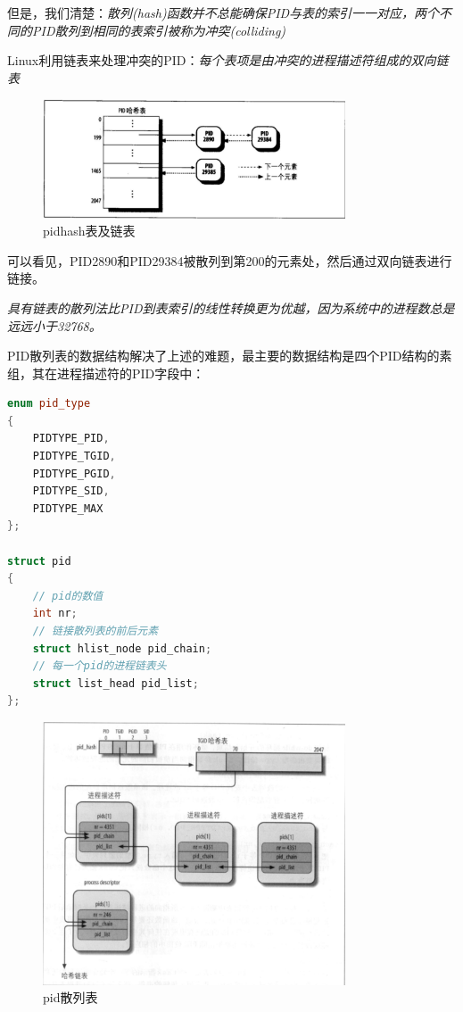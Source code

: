     但是，我们清楚：\emph{散列(hash)函数并不总能确保PID与表的索引一一对应，两个不同的PID散列到相同的表索引被称为冲突(colliding)}

    Linux利用链表来处理冲突的PID：\emph{每个表项是由冲突的进程描述符组成的双向链表}

\begin{figure}[!htbp]
    \centering
    \includegraphics[width=0.8\textwidth]{image/chapter03/pidhash表及链表.png}
    \caption{pidhash表及链表}
\end{figure}

    可以看见，PID2890和PID29384被散列到第200的元素处，然后通过双向链表进行链接。

    \emph{具有链表的散列法比PID到表索引的线性转换更为优越，因为系统中的进程数总是远远小于32768。}

    PID散列表的数据结构解决了上述的难题，最主要的数据结构是四个PID结构的素组，其在进程描述符的PID字段中：

\begin{lstlisting}[language=C++]
enum pid_type
{
	PIDTYPE_PID,
	PIDTYPE_TGID,
	PIDTYPE_PGID,
	PIDTYPE_SID,
	PIDTYPE_MAX
};

struct pid
{
    // pid的数值
	int nr;
    // 链接散列表的前后元素
	struct hlist_node pid_chain;
	// 每一个pid的进程链表头
	struct list_head pid_list;
};
\end{lstlisting}

\begin{figure}[!htbp]
    \centering
    \includegraphics[width=0.8\textwidth]{image/chapter03/pid散列表.png}
    \caption{pid散列表}
\end{figure}

